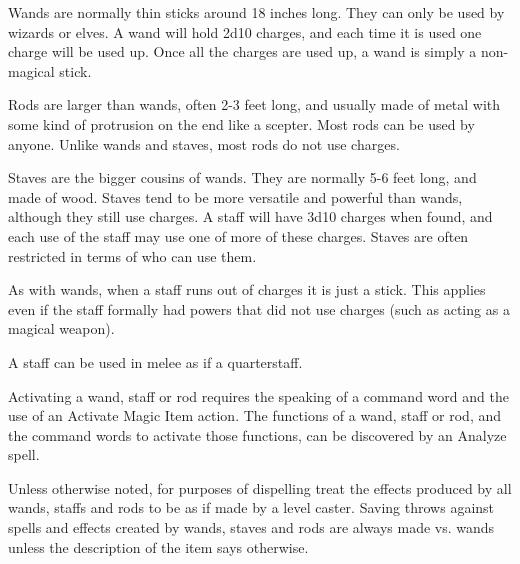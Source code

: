 \begin{multicols*}{2}
Wands are normally thin sticks around 18 inches long. They can only be used by wizards or elves. A wand will hold 2d10 charges, and each time it is used one charge will be used up. Once all the charges are used up, a wand is simply a non-magical stick.

Rods are larger than wands, often 2-3 feet long, and usually made of metal with some kind of protrusion on the end like a scepter. Most rods can be used by anyone. Unlike wands and staves, most rods do not use charges.

Staves are the bigger cousins of wands. They are normally 5-6 feet long, and made of wood. Staves tend to be more versatile and powerful than wands, although they still use charges. A staff will have 3d10 charges when found, and each use of the staff may use one of more of these charges. Staves are often restricted in terms of who can use them.

As with wands, when a staff runs out of charges it is just a stick. This applies even if the staff formally had powers that did not use charges (such as acting as a magical weapon).

A staff can be used in melee as if a quarterstaff.

Activating a wand, staff or rod requires the speaking of a command word and the use of an Activate Magic Item action. The functions of a wand, staff or rod, and the command words to activate those functions, can be discovered by an Analyze spell.

Unless otherwise noted, for purposes of dispelling treat the effects produced by all wands, staffs and rods to be as if made by a  level caster. Saving throws against spells and effects created by wands, staves and rods are always made vs. wands unless the description of the item says otherwise.


\end{multicols*}
